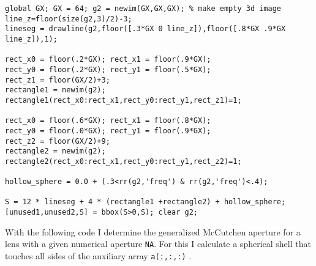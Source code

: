 \begin{lstlisting}[style=mymatlab]
global GX; GX = 64; g2 = newim(GX,GX,GX); % make empty 3d image
line_z=floor(size(g2,3)/2)-3;
lineseg = drawline(g2,floor([.3*GX 0 line_z]),floor([.8*GX .9*GX line_z]),1);

rect_x0 = floor(.2*GX); rect_x1 = floor(.9*GX);
rect_y0 = floor(.2*GX); rect_y1 = floor(.5*GX);
rect_z1 = floor(GX/2)+3;
rectangle1 = newim(g2);
rectangle1(rect_x0:rect_x1,rect_y0:rect_y1,rect_z1)=1;

rect_x0 = floor(.6*GX); rect_x1 = floor(.8*GX);
rect_y0 = floor(.0*GX); rect_y1 = floor(.9*GX);
rect_z2 = floor(GX/2)+9;
rectangle2 = newim(g2);
rectangle2(rect_x0:rect_x1,rect_y0:rect_y1,rect_z2)=1;

hollow_sphere = 0.0 + (.3<rr(g2,'freq') & rr(g2,'freq')<.4); 

S = 12 * lineseg + 4 * (rectangle1 +rectangle2) + hollow_sphere;
[unused1,unused2,S] = bbox(S>0,S); clear g2;
\end{lstlisting}  %
\vspace{-6.33cm}\hspace{9cm} 

\vspace{3cm} With the following code I determine the generalized
McCutchen aperture for a lens with a given numerical aperture
\verb!NA!. For this I calculate a spherical shell that touches all
sides of the auxiliary array \verb!a(:,:,:)! \citep{Vembu1961}.

